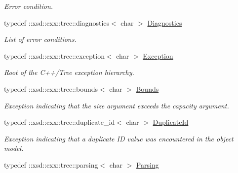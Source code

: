 \begin{DoxyCompactItemize}
\begin{DoxyCompactList}\small\item\em Error condition. \item\end{DoxyCompactList}\item 
\hypertarget{namespacexml__schema_aeacc5a291452af2cabc910be1bae640d}{
typedef ::xsd::cxx::tree::diagnostics$<$ char $>$ \hyperlink{namespacexml__schema_aeacc5a291452af2cabc910be1bae640d}{Diagnostics}}
\label{namespacexml__schema_aeacc5a291452af2cabc910be1bae640d}

\begin{DoxyCompactList}\small\item\em List of error conditions. \item\end{DoxyCompactList}\item 
\hypertarget{namespacexml__schema_ac873abff0228946d91e7ababf2cededc}{
typedef ::xsd::cxx::tree::exception$<$ char $>$ \hyperlink{namespacexml__schema_ac873abff0228946d91e7ababf2cededc}{Exception}}
\label{namespacexml__schema_ac873abff0228946d91e7ababf2cededc}

\begin{DoxyCompactList}\small\item\em Root of the C++/Tree exception hierarchy. \item\end{DoxyCompactList}\item 
\hypertarget{namespacexml__schema_a8ad4f95d0dda1ea131f69a7231deb0fe}{
typedef ::xsd::cxx::tree::bounds$<$ char $>$ \hyperlink{namespacexml__schema_a8ad4f95d0dda1ea131f69a7231deb0fe}{Bounds}}
\label{namespacexml__schema_a8ad4f95d0dda1ea131f69a7231deb0fe}

\begin{DoxyCompactList}\small\item\em Exception indicating that the size argument exceeds the capacity argument. \item\end{DoxyCompactList}\item 
\hypertarget{namespacexml__schema_a54fd4ff8caf281b84358720a39d7573a}{
typedef ::xsd::cxx::tree::duplicate\_\-id$<$ char $>$ \hyperlink{namespacexml__schema_a54fd4ff8caf281b84358720a39d7573a}{DuplicateId}}
\label{namespacexml__schema_a54fd4ff8caf281b84358720a39d7573a}

\begin{DoxyCompactList}\small\item\em Exception indicating that a duplicate ID value was encountered in the object model. \item\end{DoxyCompactList}\item 
\hypertarget{namespacexml__schema_a439552700a98fdcf8db5e211f47edcb6}{
typedef ::xsd::cxx::tree::parsing$<$ char $>$ \hyperlink{namespacexml__schema_a439552700a98fdcf8db5e211f47edcb6}{Parsing}}
\label{namespacexml__schema_a439552700a98fdcf8db5e211f47edcb6}


\end{DoxyCompactItemize}
